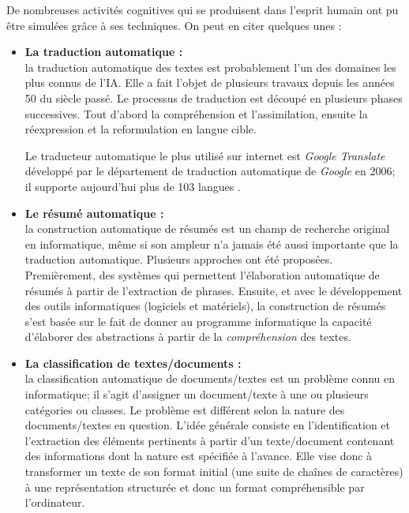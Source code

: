 De nombreuses activités cognitives qui se produisent dans l'esprit humain ont pu être simulées grâce à ses techniques.
On peut en citer quelques unes : 
\begin{itemize}[leftmargin={0.5cm}]
    \item \textbf{La traduction automatique :}\\
    la traduction automatique des textes est probablement l'un des domaines les plus connus de l'IA. Elle a fait l'objet de plusieurs travaux depuis les années 50 du siècle passé. Le processus de traduction est découpé en plusieurs phases successives. Tout d'abord la compréhension et l'assimilation, ensuite la réexpression et la reformulation en langue cible.

    Le traducteur automatique le plus utilisé sur internet est \emph{Google Translate} développé par le département de traduction automatique de \emph{Google} en 2006; il supporte aujourd'hui plus de 103 langues \cite{ggltrans}.

    \item \textbf{Le résumé automatique :}\\
    la construction automatique de résumés est un champ de recherche original en informatique, même si son ampleur n'a jamais été aussi importante que la traduction automatique. Plusieurs approches ont été proposées. Premièrement, des systèmes qui permettent l'élaboration automatique de résumés à partir de l'extraction de phrases. Ensuite, et avec le développement des outils informatiques (logiciels et matériels), la construction de résumés s'est basée sur le fait de donner au programme informatique la capacité d'élaborer des abstractions à partir de la \emph{compréhension} des textes.

    \item \textbf{La classification de textes/documents :}\\
    la classification automatique de documents/textes est un problème connu en informatique; il s'agit d'assigner un document/texte à une ou plusieurs catégories ou classes. Le problème est différent selon la nature des documents/textes en question. L'idée générale consiste en l'identification et l'extraction des éléments pertinents à partir d'un texte/document contenant des informations dont la nature est spécifiée à l'avance. Elle vise donc à transformer un texte de son format initial (une suite de chaînes de caractères) à une représentation structurée et donc un format compréhensible par l'ordinateur.\\
\end{itemize}


